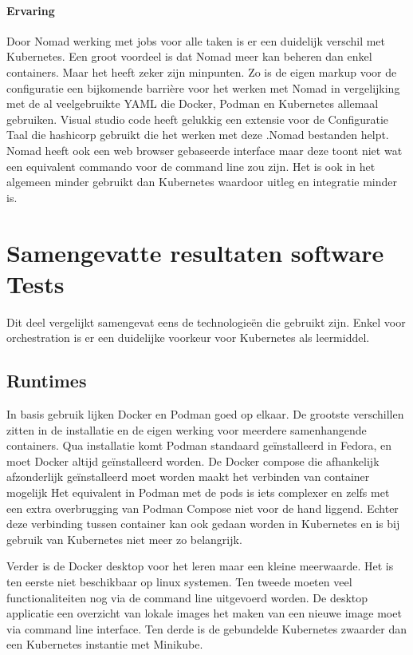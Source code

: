 \paragraph{Ervaring}
Door Nomad werking met jobs voor alle taken is er een duidelijk verschil met Kubernetes. Een groot voordeel is dat Nomad meer kan beheren dan enkel containers. Maar het heeft zeker zijn minpunten. Zo is de eigen markup voor de configuratie een bijkomende barrière voor het werken met Nomad in vergelijking met de al veelgebruikte YAML die Docker, Podman en Kubernetes allemaal gebruiken.  Visual studio code heeft gelukkig een extensie voor de Configuratie Taal die hashicorp gebruikt die het werken met deze .Nomad  bestanden helpt. Nomad heeft ook een web browser gebaseerde interface maar deze toont niet wat een equivalent commando voor de command line zou zijn. Het is ook in het algemeen minder gebruikt dan Kubernetes waardoor uitleg en integratie minder is.  

\section{Samengevatte resultaten software Tests}
Dit deel vergelijkt samengevat eens de technologieën die gebruikt zijn. Enkel voor orchestration is er een duidelijke voorkeur voor Kubernetes als leermiddel.

\subsection{Runtimes}

In basis gebruik lijken Docker en Podman goed op elkaar. De grootste verschillen zitten in de installatie en de eigen werking voor meerdere samenhangende containers. Qua installatie komt Podman standaard geïnstalleerd in Fedora, en moet Docker altijd geïnstalleerd worden. De Docker compose die afhankelijk afzonderlijk geïnstalleerd moet worden maakt het verbinden van container mogelijk  Het equivalent in Podman met de pods is iets complexer en zelfs met een extra overbrugging van Podman Compose niet voor de hand liggend. Echter deze verbinding tussen container kan ook gedaan worden in Kubernetes en is bij gebruik van Kubernetes niet meer zo belangrijk.

Verder is de Docker desktop voor het leren maar een kleine meerwaarde. Het is ten eerste niet beschikbaar op linux systemen. Ten tweede moeten veel functionaliteiten nog via de command line uitgevoerd worden. De desktop applicatie een overzicht van lokale images het maken van een nieuwe image moet via command line interface. Ten derde is de gebundelde Kubernetes zwaarder dan een Kubernetes instantie met Minikube.

